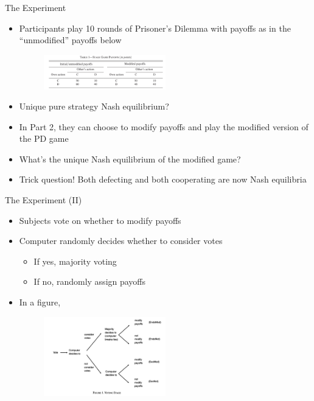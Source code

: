 \documentclass[11pt,notes=hide,aspectratio=169,mathserif]{beamer}
\begin{document}
\begin{frame}{The Experiment}
\begin{itemize}
\item Participants play 10 rounds of Prisoner's Dilemma with payoffs as in the ``unmodified'' payoffs below
\begin{figure}
\centering
\includegraphics[width=0.5\textwidth]{inputs/PD.png}
\end{figure}
\pause \item Unique pure strategy Nash equilibrium?
\item In Part 2, they can choose to modify payoffs and play the modified version of the PD game 
\pause \item What's the unique Nash equilibrium of the modified game?
\pause \item Trick question! Both defecting and both cooperating are now Nash equilibria
\end{itemize}
\end{frame}

\begin{frame}{The Experiment (II)}
\begin{itemize}
\item Subjects vote on whether to modify payoffs
\item Computer randomly decides whether to consider votes 
\begin{itemize}
    \item If yes, majority voting 
    \item If no, randomly assign payoffs
\end{itemize}
\item In a figure, 
\begin{figure}
\centering
\includegraphics[width=0.5\textwidth]{inputs/voting.png}
\end{figure}
\end{itemize}
\end{frame}
\end{document}

